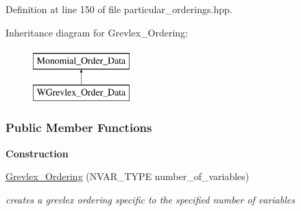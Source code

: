 Definition at line 150 of file particular\+\_\+orderings.\+hpp.

Inheritance diagram for Grevlex\+\_\+\+Ordering\+:\begin{figure}[H]
\begin{center}
\leavevmode
\includegraphics[height=2.000000cm]{group__orderinggroup}
\end{center}
\end{figure}
\subsubsection*{Public Member Functions}
\begin{Indent}\textbf{ Construction}\par
\begin{DoxyCompactItemize}
\item 
\mbox{\label{group__orderinggroup_a73efa1ac5de7104f4de26d6b2c1246ba}} 
\hyperlink{group__orderinggroup_a73efa1ac5de7104f4de26d6b2c1246ba}{Grevlex\+\_\+\+Ordering} (N\+V\+A\+R\+\_\+\+T\+Y\+PE number\+\_\+of\+\_\+variables)
\begin{DoxyCompactList}\small\item\em creates a grevlex ordering specific to the specified number of variables \end{DoxyCompactList}\end{DoxyCompactItemize}
\end{Indent}
